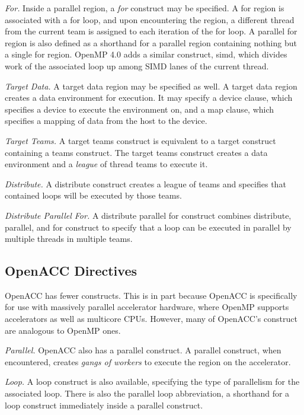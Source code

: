\documentclass{sig-alternate-05-2015}
\begin{document}
\emph{For.}
Inside a parallel region, a \emph{for} construct may be specified. A for region
is associated with a for loop, and upon encountering the region, a different
thread from the current team is assigned to each iteration of the for loop. A
parallel for region is also defined as a shorthand for a parallel region
containing nothing but a single for region. OpenMP 4.0 adds a similar
construct, simd, which divides work of the associated loop up among SIMD lanes
of the current thread. 

\emph{Target Data.}
A target data region may be specified as well. A target data region creates a
data environment for execution. It may specify a device clause, which specifies
a device to execute the environment on, and a map clause, which specifies a
mapping of data from the host to the device. 

\emph{Target Teams.}
A target teams construct is equivalent to a target construct containing a teams
construct. The target teams construct creates a data environment and a
\emph{league} of thread teams to execute it. 

\emph{Distribute.}
A distribute construct creates a league of teams and specifies that contained
loops will be executed by those teams. 

\emph{Distribute Parallel For.}
A distribute parallel for construct combines distribute, parallel, and for
construct to specify that a loop can be executed in parallel by multiple
threads in multiple teams. 

\subsection{OpenACC Directives}

OpenACC has fewer constructs. This is in part because OpenACC is specifically
for use with massively parallel accelerator hardware, where OpenMP supports
accelerators as well as multicore CPUs. %
However, many of OpenACC's construct are analogous to OpenMP ones. 

\emph{Parallel.}
OpenACC also has a parallel construct. A parallel construct, when encountered,
creates \emph{gangs of workers} to execute the region on the accelerator.

\emph{Loop.}
A loop construct is also available, specifying the type of parallelism for the
associated loop. There is also the parallel loop abbreviation, a shorthand for
a loop construct immediately inside a parallel construct. 
\end{document}
